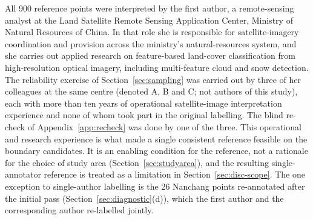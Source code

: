 \documentclass[remotesensing,article,submit,moreauthors]{Definitions/mdpi}
\begin{document}
All 900 reference points were interpreted by the first author, a remote-sensing
analyst at the Land Satellite Remote Sensing Application Center, Ministry of
Natural Resources of China. In that role she is responsible for
satellite-imagery coordination and provision across the ministry's
natural-resources system, and she carries out applied research on
feature-based land-cover classification from high-resolution optical imagery,
including multi-feature cloud and snow detection. The reliability exercise of
Section~\ref{sec:sampling} was carried out by three of her colleagues at the
same centre (denoted A, B and C; not authors of this study), each with more
than ten years of operational satellite-image interpretation experience and
none of whom took part in the original labelling. The blind re-check of
Appendix~\ref{app:recheck} was done by one of the three. This operational and
research experience is what made a single consistent reference feasible on the
boundary candidates. It is an enabling condition for the reference, not a
rationale for the choice of study area (Section~\ref{sec:studyarea}), and the
resulting single-annotator reference is treated as a limitation in
Section~\ref{sec:disc-scope}. The one exception to single-author labelling is the 26
Nanchang points re-annotated after the initial pass
(Section~\ref{sec:diagnostic}(d)), which the first author and the
corresponding author re-labelled jointly.
\end{document}
